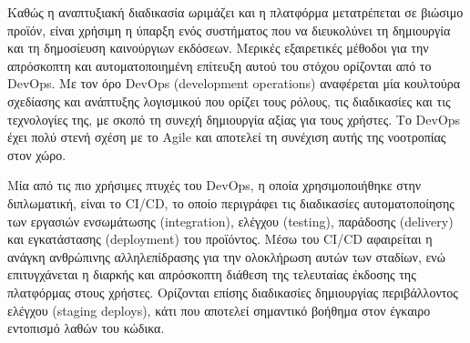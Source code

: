 Καθώς η αναπτυξιακή διαδικασία ωριμάζει και η πλατφόρμα μετατρέπεται σε βιώσιμο προϊόν, είναι χρήσιμη η ύπαρξη ενός συστήματος που να διευκολύνει τη δημιουργία και τη δημοσίευση καινούργιων εκδόσεων. Μερικές εξαιρετικές μέθοδοι για την απρόσκοπτη και αυτοματοποιημένη επίτευξη αυτού του στόχου ορίζονται από το DevOps. Με τον όρο DevOps (development operations) αναφέρεται μία κουλτούρα σχεδίασης και ανάπτυξης λογισμικού που ορίζει τους ρόλους, τις διαδικασίες και τις τεχνολογίες της, με σκοπό τη συνεχή δημιουργία αξίας για τους χρήστες. Το DevOps έχει πολύ στενή σχέση με το Agile και αποτελεί τη συνέχιση αυτής της νοοτροπίας στον χώρο.

Μία από τις πιο χρήσιμες πτυχές του DevOps, η οποία χρησιμοποιήθηκε στην διπλωματική, είναι το CI/CD, το οποίο περιγράφει τις διαδικασίες αυτοματοποίησης των εργασιών ενσωμάτωσης (integration), ελέγχου (testing), παράδοσης (delivery) και εγκατάστασης (deployment) του προϊόντος. Μέσω του CI/CD αφαιρείται η ανάγκη ανθρώπινης αλληλεπίδρασης για την ολοκλήρωση αυτών των σταδίων, ενώ επιτυγχάνεται η διαρκής και απρόσκοπτη διάθεση της τελευταίας έκδοσης της πλατφόρμας στους χρήστες. Ορίζονται επίσης διαδικασίες δημιουργίας περιβάλλοντος ελέγχου (staging deploys), κάτι που αποτελεί σημαντικό βοήθημα στον έγκαιρο εντοπισμό λαθών του κώδικα.
